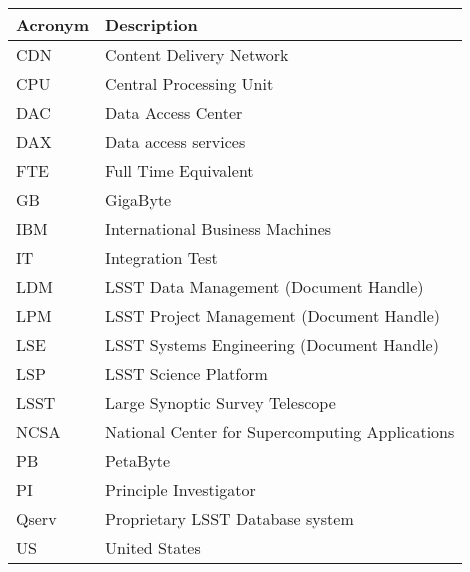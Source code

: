 \addtocounter{table}{-1}
\begin{longtable}{|l|p{}|}\hline
\textbf{Acronym} & \textbf{Description}  \\\hline

CDN & Content Delivery Network \\\hline
CPU & Central Processing Unit \\\hline
DAC & Data Access Center \\\hline
DAX & Data access services \\\hline
FTE & Full Time Equivalent \\\hline
GB & GigaByte \\\hline
IBM & International Business Machines \\\hline
IT & Integration Test \\\hline
LDM & LSST Data Management (Document Handle) \\\hline
LPM & LSST Project Management (Document Handle) \\\hline
LSE & LSST Systems Engineering (Document Handle) \\\hline
LSP & LSST Science Platform \\\hline
LSST & Large Synoptic Survey Telescope \\\hline
NCSA & National Center for Supercomputing Applications \\\hline
PB & PetaByte \\\hline
PI & Principle Investigator \\\hline
Qserv & Proprietary LSST Database system \\\hline
US & United States \\\hline
\end{longtable}
